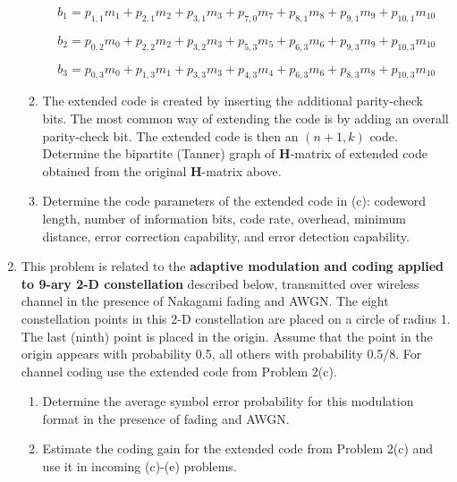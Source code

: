 \documentclass[fleqn]{article}
\begin{document}
\begin{enumerate}
\begin{enumerate}
			\begin{equation*}
				b_1 = p_{1,1}m_{1} + p_{2,1}m_{2} + p_{3,1}m_{3} + p_{7,0}m_{7} + p_{8,1}m_{8} + p_{9,1}m_{9} + p_{10,1}m_{10}
			\end{equation*}
			
			\begin{equation*}
				b_2 = p_{0,2}m_{0} + p_{2,2}m_{2} + p_{3,2}m_{3} + p_{5,3}m_{5} + p_{6,3}m_{6} + p_{9,3}m_{9} + p_{10,3}m_{10}
			\end{equation*}
			
			\begin{equation*}
				b_3 = p_{0,3}m_{0} + p_{1,3}m_{1} + p_{3,3}m_{3} + p_{4,3}m_{4} + p_{6,3}m_{6} + p_{8,3}m_{8} + p_{10,3}m_{10}
			\end{equation*}
			
			\item The extended code is created by inserting the additional parity-check bits. The most common way of extending the code is by adding an overall parity-check bit. The extended code is then an $(n+1,k)$ code. Determine the bipartite (Tanner) graph of $\mathbf{H}$-matrix of extended code obtained from the original $\mathbf{H}$-matrix above.

			\item Determine the code parameters of the extended code in (c): codeword length, number of information bits, code rate, overhead, minimum distance, error correction capability, and error detection capability.
		\end{enumerate}
		
		\item This problem is related to the \textbf{adaptive modulation and coding applied to 9-ary 2-D constellation} described below, transmitted over wireless channel in the presence of Nakagami fading and AWGN. The eight constellation points in this 2-D constellation are placed on a circle of radius 1. The last (ninth) point is placed in the origin. Assume that the point in the origin appears with probability 0.5, all others with probability 0.5/8. For channel coding use the extended code from Problem 2(c).
		
		\begin{enumerate}
			\item Determine the average symbol error probability for this modulation format in the presence of fading and AWGN.
			
			\item Estimate the coding gain for the extended code from Problem 2(c) and use it in incoming (c)-(e) problems.
			

\end{enumerate}
\end{enumerate}
\end{document}
